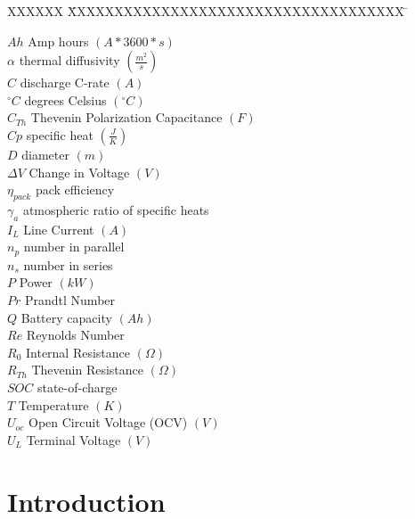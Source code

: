 \documentclass[]{aiaa-tc}%
\begin{document}
\begin{multicols}{2}
 \begin{tabbing}
  XXXXXX \= XXXXXXXXXXXXXXXXXXXXXXXXXXXXXXXXXXXX \= \kill %
  
  $Ah$ \> Amp hours $(A*3600*s)$ \\
  $\alpha$ \> thermal diffusivity $(\frac{m^{2}}{s})$\\
  $C$ \> discharge C-rate $(A)$\\
  $^\circ C$ \> degrees Celsius $(^\circ C)$\\
  $C_{Th}$ \> Thevenin Polarization Capacitance $(F)$ \\
  $Cp$ \> specific heat $(\frac{J}{K})$\\
  $D$ \> diameter $(m)$\\
  $\Delta V$ \> Change in Voltage $(V)$\\
  $\eta_{pack}$ \> pack efficiency \\
  $\gamma_a$ \> atmospheric ratio of specific heats \\
  $I_{L}$ \> Line Current $(A)$ \\
  $n_p$ \> number in parallel \\
  $n_s$ \> number in series \\
  $P$ \> Power $(kW)$ \\
  $Pr$ \> Prandtl Number \\
  $Q$\> Battery capacity $(Ah)$\\
  $Re$ \> Reynolds Number \\
  $R_{0}$ \> Internal Resistance $(\Omega)$ \\
  $R_{Th}$ \> Thevenin Resistance $(\Omega)$ \\
  $SOC$ \> state-of-charge \\
  $T$ \> Temperature $(K)$\\
  $U_{oc}$ \> Open Circuit Voltage (OCV) $(V)$ \\
  $U_{L}$ \> Terminal Voltage $(V)$ \\

 \end{tabbing}
\end{multicols}
\newpage


\section{Introduction}
\end{document}

